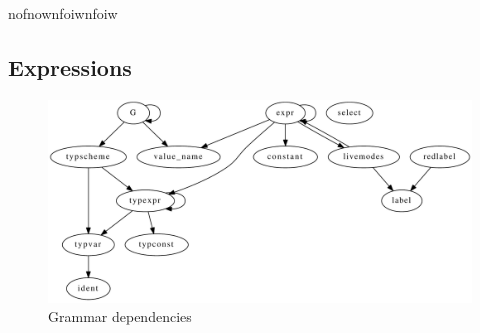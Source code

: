 \documentclass[12pt,twoside,notitlepage]{report}
\begin{document}
nofnownfoiwnfoiw

\subsection{Expressions}

\begin{figure}[h]
\begin{center}
\includegraphics[width=\linewidth]{mconbaseOttdep}
\caption{Grammar dependencies}
\end{center}
\end{figure}
\end{document}
